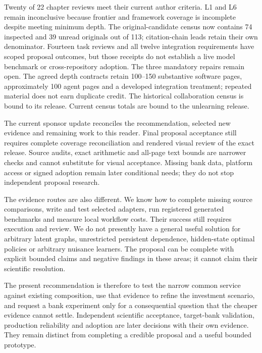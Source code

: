 Twenty of 22 chapter reviews meet their current author criteria. L1 and
L6 remain inconclusive because frontier and framework coverage is
incomplete despite meeting minimum depth. The original-candidate census
now contains 74 inspected and 39 unread originals out of 113;
citation-chain leads retain their own denominator. Fourteen task reviews
and all twelve integration requirements have scoped proposal outcomes,
but those receipts do not establish a live model benchmark or
cross-repository adoption. The three mandatory repairs remain open. The
agreed depth contracts retain 100--150 substantive software pages,
approximately 100 agent pages and a developed integration treatment;
repeated material does not earn duplicate credit.
\citep{sp23nt_progress,sp19ec_census,sp18ar_census,sp18f_census,sp13_scope}
The historical collaboration census is bound to its release.
\citep{sp24collaboration_progress} Current census totals are bound to
the unlearning release. \citep{sp24unlearning_progress}

The current sponsor update reconciles the recommendation, selected new
evidence and remaining work to this reader. Final proposal acceptance
still requires complete coverage reconciliation and rendered visual
review of the exact release. Source audits, exact arithmetic and
all-page text bounds are narrower checks and cannot substitute for
visual acceptance. Missing bank data, platform access or signed adoption
remain later conditional needs; they do not stop independent proposal
research. \citep{sp23nt_reader,sp23nt_progress}

The evidence routes are also different. We know how to complete missing
source comparisons, write and test selected adapters, run registered
generated benchmarks and measure local workflow costs. Their success
still requires execution and review. We do not presently have a general
useful solution for arbitrary latent graphs, unrestricted persistent
dependence, hidden-state optimal policies or arbitrary nuisance
learners. The proposal can be complete with explicit bounded claims and
negative findings in these areas; it cannot claim their scientific
resolution. \citep{sp23nt_reader,
sp13_persistence,sp13_servicing_successor}

The present recommendation is therefore to test the narrow common
service against existing composition, use that evidence to refine the
investment scenario, and request a bank experiment only for a
consequential question that the cheaper evidence cannot settle.
Independent scientific acceptance, target-bank validation, production
reliability and adoption are later decisions with their own evidence.
They remain distinct from completing a credible proposal and a useful
bounded prototype.

